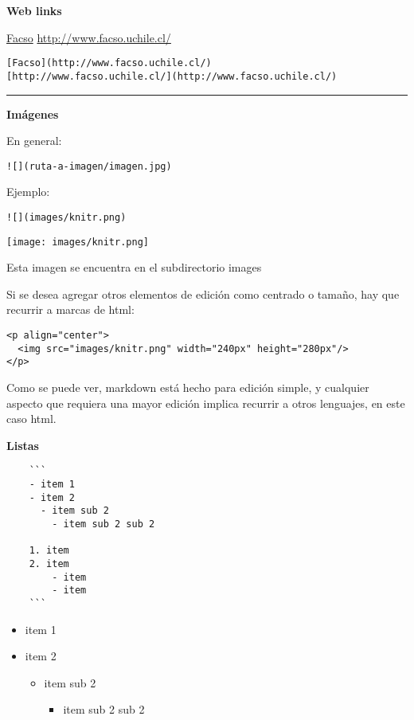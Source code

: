 \documentclass[
  11pt,
]{book}
\providecommand{\tightlist}{%
  \setlength{\itemsep}{0pt}\setlength{\parskip}{0pt}}
\begin{document}
\textbf{Web links}

\href{http://www.facso.uchile.cl/}{Facso}
\url{http://www.facso.uchile.cl/}

\begin{verbatim}
[Facso](http://www.facso.uchile.cl/)
[http://www.facso.uchile.cl/](http://www.facso.uchile.cl/)
\end{verbatim}

\begin{center}\rule{0.5\linewidth}{0.5pt}\end{center}

\textbf{Imágenes}

En general:

\begin{verbatim}
![](ruta-a-imagen/imagen.jpg)
\end{verbatim}

Ejemplo:

\begin{verbatim}
![](images/knitr.png)
\end{verbatim}

\texttt{[image: images/knitr.png]}

Esta imagen se encuentra en el subdirectorio images

Si se desea agregar otros elementos de edición como centrado o tamaño, hay que recurrir a marcas de html:

\begin{verbatim}
<p align="center">
  <img src="images/knitr.png" width="240px" height="280px"/>
</p>
\end{verbatim}

Como se puede ver, markdown está hecho para edición simple, y cualquier aspecto que requiera una mayor edición implica recurrir a otros lenguajes, en este caso html.

\textbf{Listas}

\begin{verbatim}
    ```
    - item 1
    - item 2
      - item sub 2
        - item sub 2 sub 2

    1. item
    2. item
        - item
        - item
    ```
\end{verbatim}

\begin{itemize}
\tightlist
\item
  item 1
\item
  item 2

  \begin{itemize}
  \tightlist
  \item
    item sub 2

    \begin{itemize}
    \tightlist
    \item
      item sub 2 sub 2
    \end{itemize}
  \end{itemize}
\end{itemize}
\end{document}
